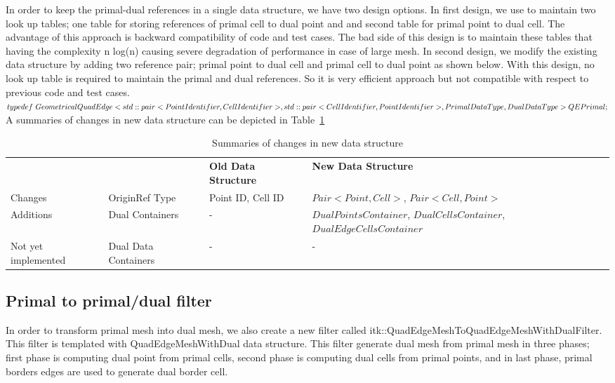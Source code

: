 \documentclass{InsightArticle}
\begin{document}
In order to keep the primal-dual references in a single data structure, we have two design options. In first design, we use to maintain two look up tables; one table for storing references of primal cell to dual point and and second table for primal point to dual cell. The advantage of this approach is backward compatibility of code and test cases. The bad side of this design is to maintain these tables that having the complexity n log(n) causing severe degradation of performance in case of large mesh. In second design, we modify the existing data structure by adding two reference pair; primal point to dual cell and primal cell to dual point as shown below. With this design, no look up table is required to maintain the primal and dual references. So it is very efficient approach but not compatible with respect to previous code and test cases. 
$typedef \ GeometricalQuadEdge< \\
    std::pair<PointIdentifier, CellIdentifier>, \\
    std::pair<CellIdentifier,  PointIdentifier>, \\
    PrimalDataType, DualDataType \\
    > QEPrimal;$
A summaries of changes in new data structure can be depicted in Table~\ref{table:secondDesign}
\begin{table}
	\begin{center}
		\caption{Summaries of changes in new data structure}
		\label{table:secondDesign}
		\begin{tabular}{ p{3.5cm} p{3.5cm} p{2cm} p{3.7cm} }
			\hline	
			\noalign{\smallskip} 
			{\bf  }	& {\bf } 	& {\bf Old Data Structure}	& {\bf New Data Structure}\\
			\noalign{\smallskip}	
			\hline  	
			\noalign{\smallskip}
			Changes & OriginRef Type & Point ID, Cell ID & $Pair<Point, Cell>$, $Pair<Cell, Point>$\\ 
			Additions & Dual Containers & - & $DualPointsContainer$, $DualCellsContainer$, $DualEdgeCellsContainer$\\
			Not yet implemented & Dual Data Containers & - & -\\
			\hline
	\end{tabular}
	\end{center}
\end{table}
\subsection{Primal to primal/dual filter }
In order to transform primal mesh into dual mesh, we also create a new filter called itk::QuadEdgeMeshToQuadEdgeMeshWithDualFilter. This filter is templated with QuadEdgeMeshWithDual data structure. This filter generate dual mesh from primal mesh in three phases; first phase is computing dual point from primal cells, second phase is computing dual cells from primal points, and in last phase, primal borders edges are used to generate dual border cell.
\end{document}
